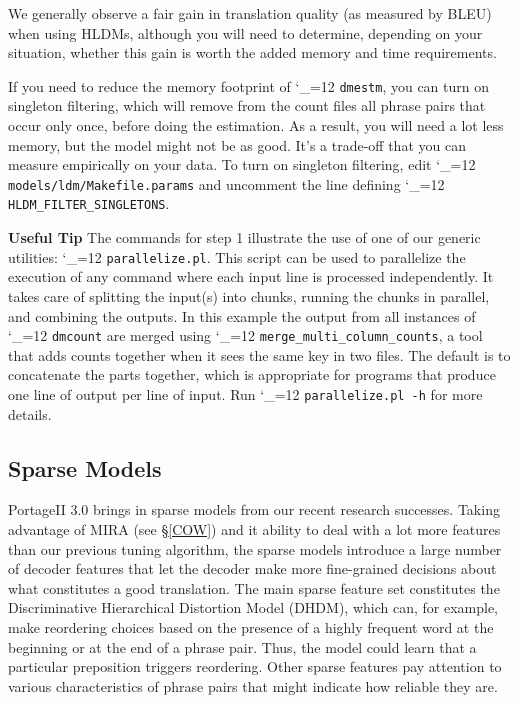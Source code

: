 \documentclass[11pt,letterpaper]{article}
\newcommand{\PS}{PortageII\xspace}
\def\code{\begingroup\catcode`\_=12 \codex}
\newcommand{\codex}[1]{\texttt{#1}\endgroup}
\newcommand{\tip}{\textbf{Useful Tip \large{\ding{43}} }}
\newcommand{\margintip}{\marginpar[{\textbf{Tip \large{\ding{43}}}}]{\textbf{\reflectbox{\large{\ding{43}}} Tip}}}
\newcommand{\tipend}{\textbf{ \reflectbox{\large{\ding{43}}}}}
\begin{document}
We generally observe a fair gain in translation quality (as measured by BLEU)
when using HLDMs, although you will need to determine, depending on your
situation, whether this gain is worth the added memory and time requirements.

If you need to reduce the memory footprint of \code{dmestm}, you can turn on
singleton filtering, which will remove from the count files all phrase pairs
that occur only once, before doing the estimation.  As a result, you will need
a lot less memory, but the model might not be as good. It's a trade-off that
you can measure empirically on your data.  To turn on singleton filtering, edit
\code{models/ldm/Makefile.params} and uncomment the line defining
\code{HLDM_FILTER_SINGLETONS}.

\tip\margintip The commands for step 1 illustrate the use of one of our generic
utilities: \code{parallelize.pl}.  This script can be used to parallelize the
execution of any command where each input line is processed independently.  It
takes care of splitting the input(s) into chunks, running the chunks in
parallel, and combining the outputs.  In this
example the output from all instances of \code{dmcount} are merged using
\code{merge_multi_column_counts}, a tool that adds counts together when it sees
the same key in two files.  The default is to concatenate the parts together,
which is appropriate for programs that produce one line of output per line of
input.  Run \code{parallelize.pl -h} for more details.\tipend

\subsection{Sparse Models} \label{sparse}

\PS 3.0 brings in sparse models from our recent research successes.
Taking advantage of MIRA (see \S\ref{COW}) and it ability to deal with a lot
more features than our previous tuning algorithm, the sparse models introduce a
large number of decoder features that let the decoder make more fine-grained
decisions about what constitutes a good translation. The main sparse feature
set constitutes the Discriminative Hierarchical Distortion Model (DHDM), which
can, for example, make reordering choices based on the presence of a highly
frequent word at the beginning or at the end of a phrase pair. Thus, the model
could learn that a particular preposition triggers reordering. Other sparse
features pay attention to various characteristics of phrase pairs that might
indicate how reliable they are.
\end{document}

